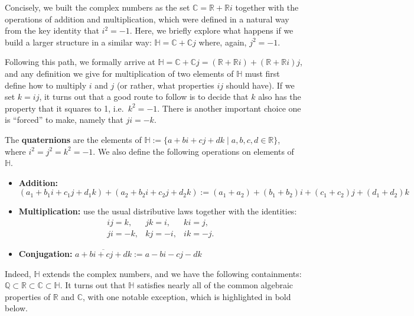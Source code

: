 Concisely, we built the complex numbers as the set $\mathbb{C} = \mathbb{R} + \mathbb{R}i$ together with the operations of addition and multiplication, which were defined in a natural way from the key identity that $i^2 = -1$. Here, we briefly explore what happens if we build a larger structure in a similar way: $\mathbb{H} = \mathbb{C} + \mathbb{C}j$ where, again, $j^2 = -1$. 

Following this path, we formally arrive at $\mathbb{H} = \mathbb{C} + \mathbb{C}j= (\mathbb{R} + \mathbb{R}i) + (\mathbb{R} + \mathbb{R}i)j$, and any definition we give for multiplication of two elements of $\mathbb{H}$ must first define how to multiply $i$ and $j$ (or rather, what properties $ij$ should have). If we set $k=ij$, it turns out that a good route to follow is to decide that $k$ also has the property that it squares to 1, i.e.~$k^2 = -1$. There is another important choice one is ``forced'' to make, namely that $ji = -k$.

\begin{definition}
The \textbf{quaternions} are the elements of $\mathbb{H} := \{a + bi+ cj + dk\mid a,b,c,d \in \mathbb{R}\}$, where $i^2 = j^2 = k^2= -1$. We also define the following operations on elements of $\mathbb{H}$.
\begin{itemize}
\item \textbf{Addition:} $(a_1 + b_1i+ c_1j + d_1k) + (a_2 + b_2i+ c_2j + d_2k) := (a_1+a_2) + (b_1+b_2)i+ (c_1+c_2)j + (d_1+d_2)k$
\item \textbf{Multiplication:} use the usual distributive laws together with the identities:
\[\begin{array}{lll}
ij = k, &jk = i, &ki = j,\\
ji = -k, &kj = -i, &ik = -j.
\end{array}\]
\item \textbf{Conjugation:} $\overline{a + bi+ cj + dk} := a - bi -cj - dk$
\end{itemize}
\end{definition}

Indeed, $\mathbb{H}$ extends the complex numbers, and we have the following containments: $\mathbb{Q}\subset\mathbb{R}\subset\mathbb{C}\subset\mathbb{H}$. It turns out that $\mathbb{H}$ satisfies nearly all of the common algebraic properties of $\mathbb{R}$ and $\mathbb{C}$, with one notable exception, which is highlighted in bold below.

